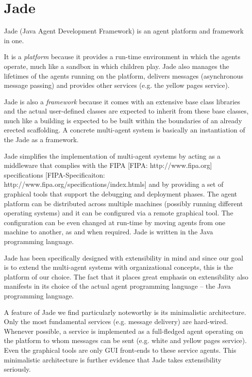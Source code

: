 \section{Jade}

Jade (Java Agent Development Framework) is an agent platform and framework in one.

It is a \textit{platform} because it provides a run-time environment in which the agents operate, much like a sandbox in which children play.
Jade also manages the lifetimes of the agents running on the platform, delivers messages (asynchronous message passing) and provides other services (e.g. the yellow pages service).

Jade is also a \textit{framework} because it comes with an extensive base class libraries and the actual user-defined classes are expected to inherit from these base classes, much like a building is expected to be built within the boundaries of an already erected scaffolding.
A concrete multi-agent system is basically an instantiation of the Jade as a framework.

Jade simplifies the implementation of multi-agent systems by acting as a middleware that complies with the FIPA
[FIPA: http://www.fipa.org]
specifications
[FIPA-Specificaiton: http://www.fipa.org/specifications/index.htmls] and by providing a set of graphical tools that support the debugging and deployment phases.
The agent platform can be distributed across multiple machines (possibly running different operating systems) and it can be configured via a remote graphical tool.
The configuration can be even changed at run-time by moving agents from one machine to another, as and when required. 
Jade is written in the Java programming language. 

Jade has been specifically designed with extensibility in mind and since our goal is to extend the multi-agent systems with organizational concepts, this is the platform of our choice.
The fact that it places great emphasis on extensibility also manifests in its choice of the actual agent programming language -- the Java programming language.

A feature of Jade we find particularly noteworthy is its minimalistic architecture.
Only the most fundamental services (e.g. message delivery) are hard-wired.
Whenever possible, a service is implemented as a full-fledged agent operating on the platform to whom messages can be sent (e.g. white and yellow pages service).
Even the graphical tools are only GUI front-ends to these service agents.
This minimalistic architecture is further evidence that Jade takes extensibility seriously.

